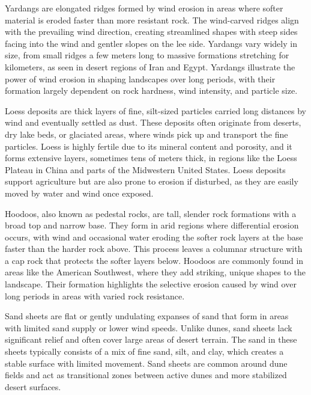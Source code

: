 Yardangs are elongated ridges formed by wind erosion in areas where softer material is eroded faster than more resistant rock. The wind-carved ridges align with the prevailing wind direction, creating streamlined shapes with steep sides facing into the wind and gentler slopes on the lee side. Yardangs vary widely in size, from small ridges a few meters long to massive formations stretching for kilometers, as seen in desert regions of Iran and Egypt. Yardangs illustrate the power of wind erosion in shaping landscapes over long periods, with their formation largely dependent on rock hardness, wind intensity, and particle size.

Loess deposits are thick layers of fine, silt-sized particles carried long distances by wind and eventually settled as dust. These deposits often originate from deserts, dry lake beds, or glaciated areas, where winds pick up and transport the fine particles. Loess is highly fertile due to its mineral content and porosity, and it forms extensive layers, sometimes tens of meters thick, in regions like the Loess Plateau in China and parts of the Midwestern United States. Loess deposits support agriculture but are also prone to erosion if disturbed, as they are easily moved by water and wind once exposed.

Hoodoos, also known as pedestal rocks, are tall, slender rock formations with a broad top and narrow base. They form in arid regions where differential erosion occurs, with wind and occasional water eroding the softer rock layers at the base faster than the harder rock above. This process leaves a columnar structure with a cap rock that protects the softer layers below. Hoodoos are commonly found in areas like the American Southwest, where they add striking, unique shapes to the landscape. Their formation highlights the selective erosion caused by wind over long periods in areas with varied rock resistance.

Sand sheets are flat or gently undulating expanses of sand that form in areas with limited sand supply or lower wind speeds. Unlike dunes, sand sheets lack significant relief and often cover large areas of desert terrain. The sand in these sheets typically consists of a mix of fine sand, silt, and clay, which creates a stable surface with limited movement. Sand sheets are common around dune fields and act as transitional zones between active dunes and more stabilized desert surfaces.

